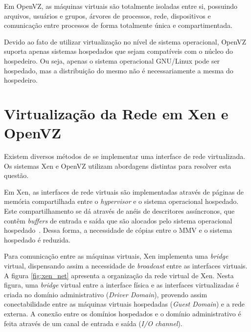 \documentclass[12pt]{article}
\def\hvisor{\textit{hypervisor}\xspace}
\begin{document}
Em OpenVZ, as máquinas virtuais são totalmente isoladas entre si, possuindo arquivos, usuários e grupos, árvores de processos, rede, dispositivos e comunicação entre processos de forma totalmente única e compartimentada. 

Devido ao fato de utilizar virtualização no nível de sistema operacional, OpenVZ suporta apenas sistemas hospedados que sejam compatíveis com o núcleo do hospedeiro. Ou seja, apenas o sistema operacional GNU/Linux pode ser hospedado, mas a distribuição do mesmo não é necessariamente a mesma do hospedeiro.


\section{Virtualização da Rede em Xen e OpenVZ}\label{s:virtualizacao}

Existem diversos métodos de se implementar uma interface de rede virtualizada. Os sistemas Xen e OpenVZ utilizam abordagens distintas para resolver esta questão.

Em Xen, as interfaces de rede virtuais são implementadas através de páginas de memória compartilhada entre o \hvisor e o sistema operacional hospedado. Este compartilhamento se dá através de anéis de descritores assíncronos, que contêm \emph{buffers} de entrada e saída que são alocados pelo sistema operacional hospedado~\cite{urschei2007amorvm}. Dessa forma, a necessidade de cópias entre o MMV e o sistema hospedado é reduzida. 

Para comunicação entre as máquinas virtuais, Xen implementa uma \emph{bridge} virtual, dispensando assim a necessidade de \emph{broadcast} entre as interfaces virtuais. A figura \ref{fig:xen_net} apresenta a organização da rede virtual de Xen. Nesta figura, uma \emph{bridge} virtual entre a interface física e as interfaces virtualizadas é criada no domínio administrativo (\emph{Driver Domain}), provendo assim conectabilidade entre as máquinas virtuais hospedadas (\emph{Guest Domain}) e a rede externa. A conexão entre os domínios hospedados e o domínio administrativo é feita através de um canal de entrada e saída (\emph{I/O channel}).
\end{document}
